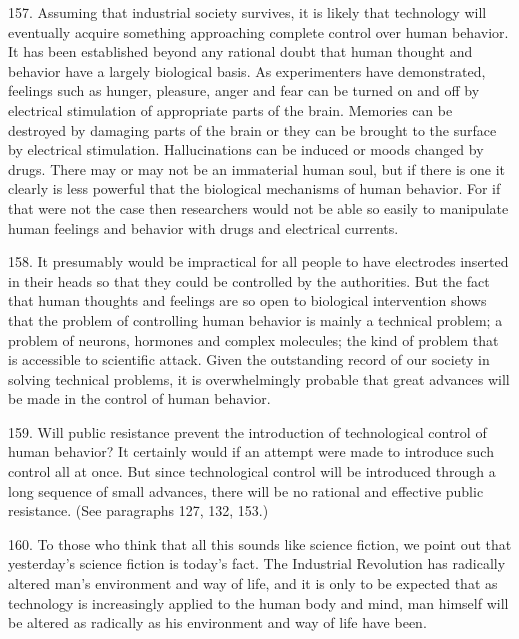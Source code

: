 \documentclass{article}
\begin{document}
157.  Assuming that industrial society survives, it is likely that technology will eventually acquire 
something  approaching  complete  control  over  human  behavior.   It  has  been  established  beyond  
any  rational  doubt  that  human  thought  and  behavior  have  a  largely  biological  basis.   As 
experimenters have demonstrated, feelings such as hunger, pleasure, anger and fear can be turned 
on and off by electrical stimulation of appropriate parts of the brain.  Memories can be destroyed 
by damaging parts of the brain or they can be brought to the surface by electrical 
stimulation.  Hallucinations can be induced or moods changed by drugs.  There may or may not 
be  an  immaterial  human  soul,  but  if  there  is  one  it  clearly  is  less  powerful  that  the  biological  
mechanisms of human behavior.  For if that were not the case then researchers would not be able 
so easily to manipulate human feelings and behavior with drugs and electrical currents. \vspace{\baselineskip}

158.  It presumably would be impractical for all people to have electrodes inserted in their heads 
so that they could be controlled by the authorities.  But the fact that human thoughts and feelings 
are  so  open  to  biological  intervention  shows  that  the  problem  of  controlling  human  behavior  is  
mainly a technical problem; a problem of neurons, hormones and complex molecules; the kind of 
problem  that  is  accessible  to  scientific  attack.   Given  the  outstanding  record  of  our  society  in  
solving technical problems, it is overwhelmingly probable that great advances will be made in the 
control of human behavior. \vspace{\baselineskip}

159.  Will public resistance prevent the introduction of technological control of human behavior? 
It  certainly  would  if  an  attempt  were  made  to  introduce  such  control  all  at  once.   But  since  
technological control will be introduced through a long sequence of small advances, there will be 
no rational and effective public resistance.  (See paragraphs 127, 132, 153.) \vspace{\baselineskip}

160.  To  those  who  think  that  all  this  sounds  like  science  fiction,  we  point  out  that  yesterday’s  
science fiction is today’s fact.  The Industrial Revolution has radically altered man’s environment 
and way of life, and it is only to be expected that as technology is increasingly applied to the human 
body and mind, man himself will be altered as radically as his environment and way of life have 
been. 
\end{document}
